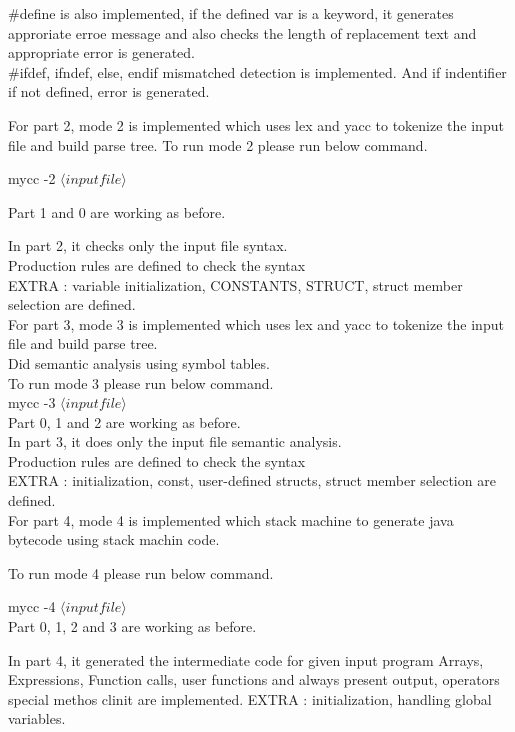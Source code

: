 \documentclass{article}
\begin{document}
$\#$define is also implemented, if the defined var is a keyword, it generates approriate erroe message and also checks the length of replacement text and appropriate error is generated. \\

$\#$ifdef, ifndef, else, endif mismatched detection is implemented.
And if indentifier if not defined,  error is generated.

For part 2,  mode 2 is implemented which uses lex and yacc to tokenize the input file and build parse tree. To run mode 2 please run below command.

mycc -2 $\langle input file\rangle$

Part 1 and 0 are working as before.

In part 2, it checks only the input file syntax.  \\
Production rules are defined to check the syntax \\
EXTRA : variable initialization, CONSTANTS, STRUCT, struct member selection are defined. \\

For part 3,  mode 3 is implemented which uses lex and yacc to tokenize the input file and build parse tree. \\
Did semantic analysis using symbol tables. \\

To run mode 3 please run below command. \\

mycc -3  $\langle input file\rangle$ \\

Part 0, 1 and 2 are working as before. \\

In part 3, it does only the input file semantic analysis. \\
Production rules are defined to check the syntax \\
EXTRA :  initialization, const, user-defined structs, struct member selection are defined. \\

For part 4,  mode 4 is implemented which stack machine to generate java bytecode using stack machin code.

To run mode 4 please run below command.

mycc -4  $\langle input file\rangle$ \\

Part 0, 1, 2 and 3 are working as before.

In part 4, it generated the intermediate code for given input program
Arrays, Expressions, Function calls, user functions and always present output, operators
special methos clinit are implemented.
EXTRA :  initialization, handling global variables.
\end{document}
